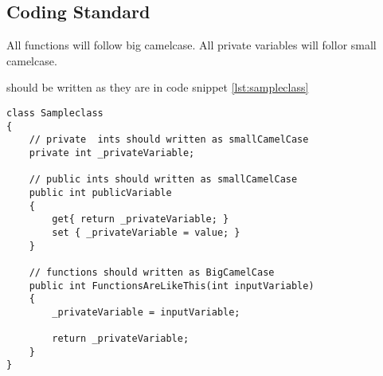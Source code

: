 \subsection{Coding Standard}
\label{subsec:coding_standard}

All functions will follow big camelcase. All private variables will follor small camelcase.

should be written as they are in code snippet \ref{lst:sampleclass}

\begin{lstlisting}[style=sourceCode, caption=\myCaption{Sampleclass.cs}, label=lst:sampleclass]
class Sampleclass
{
    // private  ints should written as smallCamelCase
    private int _privateVariable;

    // public ints should written as smallCamelCase
    public int publicVariable
    {
        get{ return _privateVariable; }
        set { _privateVariable = value; }
    }

    // functions should written as BigCamelCase
    public int FunctionsAreLikeThis(int inputVariable)
    {
        _privateVariable = inputVariable;

        return _privateVariable;
    }
}
\end{lstlisting}